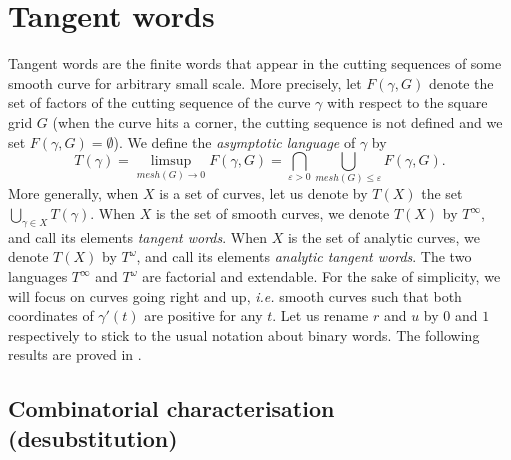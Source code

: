 \documentclass[preliminary]{eptcs}
\begin{document}
\section{Tangent words}
Tangent words are the finite words that appear in the cutting sequences of
some smooth curve for arbitrary small scale.
More precisely, let $F(\gamma,G)$ denote the set of factors of the cutting
sequence of the curve $\gamma$ with respect to the square grid $G$ (when
the curve hits a corner, the cutting sequence is not defined and we set
$F(\gamma,G)=\emptyset$).
We define the \emph{asymptotic language} of $\gamma$ by
$$\displaystyle T(\gamma) = \limsup_{mesh(G) \rightarrow 0} F(\gamma,G) =
\bigcap_{\varepsilon > 0} \bigcup_{mesh(G) \leq \varepsilon} F(\gamma,G)
.$$
More generally, when $X$ is a set of curves, let us denote by $T(X)$ the
set $\bigcup_{\gamma\in X}T(\gamma)$. When $X$ is the set of smooth
curves, we denote $T(X)$ by $T^\infty$, and call its elements
\emph{tangent words}. When $X$ is the set of analytic curves, we denote
$T(X)$ by $T^\omega$, and call its elements \emph{analytic tangent words}.
The two languages $T^\infty$ and $T^\omega$ are factorial and extendable.
\newline \newline
For the sake of simplicity, we will focus on curves going right and up,
\emph{i.e.} smooth curves such that both coordinates of $\gamma'(t)$ are
positive for any $t$. Let us rename $r$ and $u$ by $0$ and $1$
respectively to stick to the usual notation about binary words.
\newline \newline
The following results are proved in \cite{MonteilDGCI2011}.

\subsection{Combinatorial characterisation (desubstitution)}
\end{document}
